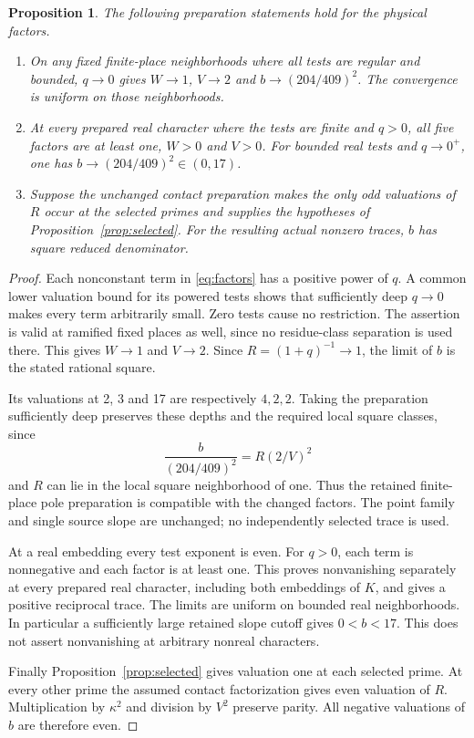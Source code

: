 \documentclass[11pt,a4paper]{article}
\newtheorem{proposition}[theorem]{Proposition}
\begin{document}
\begin{proposition}\label{prop:preparation}
The following preparation statements hold for the physical factors.
\begin{enumerate}
\item On any fixed finite-place neighborhoods where all tests are
regular and bounded, $q\to0$ gives $W\to1$, $V\to2$ and
$b\to(204/409)^2$. The convergence is uniform on those neighborhoods.
\item At every prepared real character where the tests are finite
and $q>0$, all five factors are at least one, $W>0$ and $V>0$.
For bounded real tests and $q\to0^+$, one has
$b\to(204/409)^2\in(0,17)$.
\item Suppose the unchanged contact preparation makes the only odd
valuations of $R$ occur at the selected primes and supplies the
hypotheses of Proposition~\ref{prop:selected}. For the resulting
actual nonzero traces, $b$ has square reduced denominator.
\end{enumerate}
\end{proposition}
\begin{proof}
Each nonconstant term in \eqref{eq:factors} has a positive power
of $q$. A common lower valuation bound for its powered tests shows
that sufficiently deep $q\to0$ makes every term arbitrarily small.
Zero tests cause no restriction. The assertion is valid at ramified
fixed places as well, since no residue-class separation is used there.
This gives $W\to1$ and $V\to2$. Since $R=(1+q)^{-1}\to1$,
the limit of $b$ is the stated rational square.

Its valuations at 2, 3 and 17 are respectively $4,2,2$.
Taking the preparation sufficiently deep preserves these depths
and the required local square classes, since
\[
                  \frac{b}{(204/409)^2}=R(2/V)^2
\]
and $R$ can lie in the local square neighborhood of one.
Thus the retained finite-place pole preparation is compatible with
the changed factors. The point family and single source slope are
unchanged; no independently selected trace is used.

At a real embedding every test exponent is even. For $q>0$, each
term is nonnegative and each factor is at least one. This proves
nonvanishing separately at every prepared real character, including
both embeddings of $K$, and gives a positive reciprocal trace.
The limits are uniform on bounded real neighborhoods. In particular
a sufficiently large retained slope cutoff gives $0<b<17$.
This does not assert nonvanishing at arbitrary nonreal characters.

Finally Proposition~\ref{prop:selected} gives valuation one at
each selected prime. At every other prime the assumed contact
factorization gives even valuation of $R$. Multiplication by
$\kappa^2$ and division by $V^2$ preserve parity. All negative
valuations of $b$ are therefore even.
\end{proof}
\end{document}

